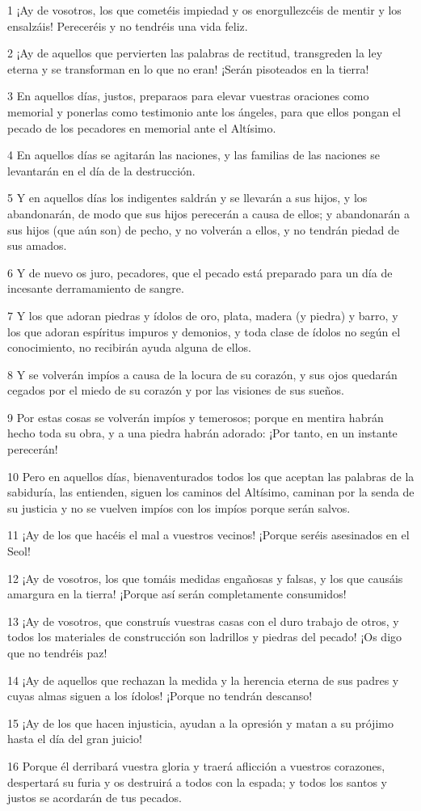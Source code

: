 \par 1 ¡Ay de vosotros, los que cometéis impiedad y os enorgullezcéis de mentir y los ensalzáis! Pereceréis y no tendréis una vida feliz.
\par 2 ¡Ay de aquellos que pervierten las palabras de rectitud, transgreden la ley eterna y se transforman en lo que no eran! ¡Serán pisoteados en la tierra!
\par 3 En aquellos días, justos, preparaos para elevar vuestras oraciones como memorial y ponerlas como testimonio ante los ángeles, para que ellos pongan el pecado de los pecadores en memorial ante el Altísimo.
\par 4 En aquellos días se agitarán las naciones, y las familias de las naciones se levantarán en el día de la destrucción.
\par 5 Y en aquellos días los indigentes saldrán y se llevarán a sus hijos, y los abandonarán, de modo que sus hijos perecerán a causa de ellos; y abandonarán a sus hijos (que aún son) de pecho, y no volverán a ellos, y no tendrán piedad de sus amados.
\par 6 Y de nuevo os juro, pecadores, que el pecado está preparado para un día de incesante derramamiento de sangre.
\par 7 Y los que adoran piedras y ídolos de oro, plata, madera (y piedra) y barro, y los que adoran espíritus impuros y demonios, y toda clase de ídolos no según el conocimiento, no recibirán ayuda alguna de ellos.
\par 8 Y se volverán impíos a causa de la locura de su corazón, y sus ojos quedarán cegados por el miedo de su corazón y por las visiones de sus sueños.
\par 9 Por estas cosas se volverán impíos y temerosos; porque en mentira habrán hecho toda su obra, y a una piedra habrán adorado: ¡Por tanto, en un instante perecerán!
\par 10 Pero en aquellos días, bienaventurados todos los que aceptan las palabras de la sabiduría, las entienden, siguen los caminos del Altísimo, caminan por la senda de su justicia y no se vuelven impíos con los impíos porque serán salvos.
\par 11 ¡Ay de los que hacéis el mal a vuestros vecinos! ¡Porque seréis asesinados en el Seol!
\par 12 ¡Ay de vosotros, los que tomáis medidas engañosas y falsas, y los que causáis amargura en la tierra! ¡Porque así serán completamente consumidos!
\par 13 ¡Ay de vosotros, que construís vuestras casas con el duro trabajo de otros, y todos los materiales de construcción son ladrillos y piedras del pecado! ¡Os digo que no tendréis paz!
\par 14 ¡Ay de aquellos que rechazan la medida y la herencia eterna de sus padres y cuyas almas siguen a los ídolos! ¡Porque no tendrán descanso!
\par 15 ¡Ay de los que hacen injusticia, ayudan a la opresión y matan a su prójimo hasta el día del gran juicio!
\par 16 Porque él derribará vuestra gloria y traerá aflicción a vuestros corazones, despertará su furia y os destruirá a todos con la espada; y todos los santos y justos se acordarán de tus pecados.

